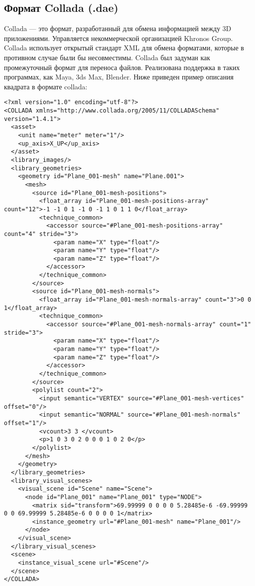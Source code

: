 \subsection{Формат Collada (.dae)}
Collada — это формат, разработанный для обмена  информацией между 3D приложениями.
Управляется некоммерческой организацией Khronos Group. Collada использует открытый стандарт XML для обмена форматами, которые в противном случае были бы несовместимы. Collada был задуман как промежуточный формат для переноса файлов.
Реализована поддержка в таких программах, как Maya, 3ds Max, Blender.
Ниже приведен пример описания квадрата в формате collada:
\begin{scriptsize}
\begin{verbatim}
<?xml version="1.0" encoding="utf-8"?>
<COLLADA xmlns="http://www.collada.org/2005/11/COLLADASchema" version="1.4.1">
  <asset>
    <unit name="meter" meter="1"/>
    <up_axis>X_UP</up_axis>
  </asset>
  <library_images/>
  <library_geometries>
    <geometry id="Plane_001-mesh" name="Plane.001">
      <mesh>
        <source id="Plane_001-mesh-positions">
          <float_array id="Plane_001-mesh-positions-array" count="12">-1 -1 0 1 -1 0 -1 1 0 1 1 0</float_array>
          <technique_common>
            <accessor source="#Plane_001-mesh-positions-array" count="4" stride="3">
              <param name="X" type="float"/>
              <param name="Y" type="float"/>
              <param name="Z" type="float"/>
            </accessor>
          </technique_common>
        </source>
        <source id="Plane_001-mesh-normals">
          <float_array id="Plane_001-mesh-normals-array" count="3">0 0 1</float_array>
          <technique_common>
            <accessor source="#Plane_001-mesh-normals-array" count="1" stride="3">
              <param name="X" type="float"/>
              <param name="Y" type="float"/>
              <param name="Z" type="float"/>
            </accessor>
          </technique_common>
        </source>
        <polylist count="2">
          <input semantic="VERTEX" source="#Plane_001-mesh-vertices" offset="0"/>
          <input semantic="NORMAL" source="#Plane_001-mesh-normals" offset="1"/>
          <vcount>3 3 </vcount>
          <p>1 0 3 0 2 0 0 0 1 0 2 0</p>
        </polylist>
      </mesh>
    </geometry>
  </library_geometries>
  <library_visual_scenes>
    <visual_scene id="Scene" name="Scene">
      <node id="Plane_001" name="Plane_001" type="NODE">
        <matrix sid="transform">69.99999 0 0 0 0 5.28485e-6 -69.99999 0 0 69.99999 5.28485e-6 0 0 0 0 1</matrix>
        <instance_geometry url="#Plane_001-mesh" name="Plane_001"/>
      </node>
    </visual_scene>
  </library_visual_scenes>
  <scene>
    <instance_visual_scene url="#Scene"/>
  </scene>
</COLLADA>
\end{verbatim}
\end{scriptsize}
